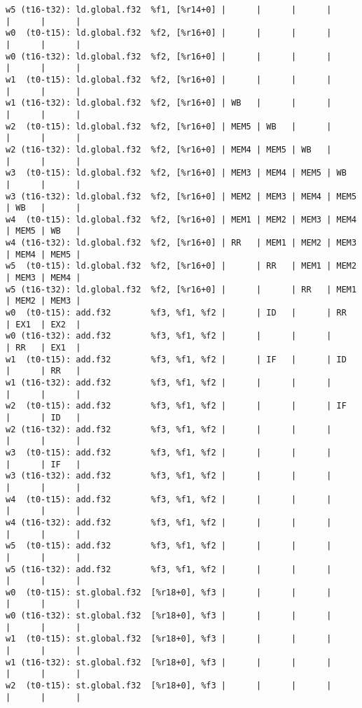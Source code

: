 \documentclass[11pt]{article}
\begin{document}
\begin{Answer}
\begin{verbatim}
w5 (t16-t32): ld.global.f32  %f1, [%r14+0] |      |      |      |      |      |      |
w0  (t0-t15): ld.global.f32  %f2, [%r16+0] |      |      |      |      |      |      |
w0 (t16-t32): ld.global.f32  %f2, [%r16+0] |      |      |      |      |      |      |
w1  (t0-t15): ld.global.f32  %f2, [%r16+0] |      |      |      |      |      |      |
w1 (t16-t32): ld.global.f32  %f2, [%r16+0] | WB   |      |      |      |      |      |
w2  (t0-t15): ld.global.f32  %f2, [%r16+0] | MEM5 | WB   |      |      |      |      |
w2 (t16-t32): ld.global.f32  %f2, [%r16+0] | MEM4 | MEM5 | WB   |      |      |      |
w3  (t0-t15): ld.global.f32  %f2, [%r16+0] | MEM3 | MEM4 | MEM5 | WB   |      |      |
w3 (t16-t32): ld.global.f32  %f2, [%r16+0] | MEM2 | MEM3 | MEM4 | MEM5 | WB   |      |
w4  (t0-t15): ld.global.f32  %f2, [%r16+0] | MEM1 | MEM2 | MEM3 | MEM4 | MEM5 | WB   |
w4 (t16-t32): ld.global.f32  %f2, [%r16+0] | RR   | MEM1 | MEM2 | MEM3 | MEM4 | MEM5 |
w5  (t0-t15): ld.global.f32  %f2, [%r16+0] |      | RR   | MEM1 | MEM2 | MEM3 | MEM4 |
w5 (t16-t32): ld.global.f32  %f2, [%r16+0] |      |      | RR   | MEM1 | MEM2 | MEM3 |
w0  (t0-t15): add.f32        %f3, %f1, %f2 |      | ID   |      | RR   | EX1  | EX2  |
w0 (t16-t32): add.f32        %f3, %f1, %f2 |      |      |      |      | RR   | EX1  |
w1  (t0-t15): add.f32        %f3, %f1, %f2 |      | IF   |      | ID   |      | RR   |
w1 (t16-t32): add.f32        %f3, %f1, %f2 |      |      |      |      |      |      |
w2  (t0-t15): add.f32        %f3, %f1, %f2 |      |      |      | IF   |      | ID   |
w2 (t16-t32): add.f32        %f3, %f1, %f2 |      |      |      |      |      |      |
w3  (t0-t15): add.f32        %f3, %f1, %f2 |      |      |      |      |      | IF   |
w3 (t16-t32): add.f32        %f3, %f1, %f2 |      |      |      |      |      |      |
w4  (t0-t15): add.f32        %f3, %f1, %f2 |      |      |      |      |      |      |
w4 (t16-t32): add.f32        %f3, %f1, %f2 |      |      |      |      |      |      |
w5  (t0-t15): add.f32        %f3, %f1, %f2 |      |      |      |      |      |      |
w5 (t16-t32): add.f32        %f3, %f1, %f2 |      |      |      |      |      |      |
w0  (t0-t15): st.global.f32  [%r18+0], %f3 |      |      |      |      |      |      |
w0 (t16-t32): st.global.f32  [%r18+0], %f3 |      |      |      |      |      |      |
w1  (t0-t15): st.global.f32  [%r18+0], %f3 |      |      |      |      |      |      |
w1 (t16-t32): st.global.f32  [%r18+0], %f3 |      |      |      |      |      |      |
w2  (t0-t15): st.global.f32  [%r18+0], %f3 |      |      |      |      |      |      |

\end{verbatim}
\end{Answer}
\end{document}
